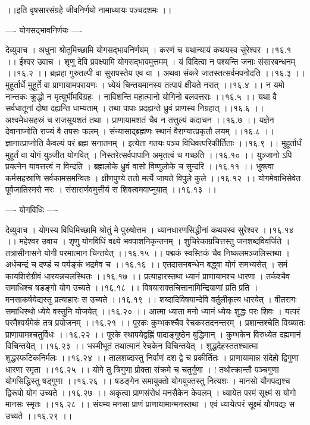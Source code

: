\documentclass[11pt]{book}
\begin{document}
\begin{landscape}
 ।।इति वृषसारसंग्रहे जीवनिर्णयो नामाध्यायः पञ्चदशमः ।।





---- योगसद्भावनिर्णयः ----

देव्युवाच ।
अधुना श्रोतुमिच्छामि योगसद्भावनिर्णयम् ।
करणं च यथान्यायं कथयस्व सुरेश्वर ।।१६.१ ।।
ईश्वर उवाच ।
शृणु देवि प्रवक्ष्यामि योगसद्भावमुत्तमम् ।
यं विदित्वा न पश्यन्ति जनाः संसारबन्धनम् ।।१६.२ ।।
ब्रह्महा गुरुतल्पी वा सुरापस्तेय एव वा ।
अथवा संकरे जातस्तत्सर्वमपनोदति ।।१६.३ ।।
मुहूर्तार्धे मुहूर्ते वा प्राणायामपरायणः ।
ध्येयं चिन्तयमानस्य तत्पापं क्षीयते नरात् ।।१६.४ ।।
न यमो नान्तकः क्रुद्धो न मृत्युर्भीमविग्रहः ।
नाविशन्ति महात्मानो योगिनो बलवत्तराः ।।१६.५ ।।
यथा वै सर्वधातूनां दोषा दह्यन्ति धाम्यताम् ।
तथा पापाः प्रदह्यन्ते ध्रुवं प्राणस्य निग्रहात् ।।१६.६ ।।
अश्वमेधसहस्रं च राजसूयशतं तथा ।
प्राणायामशतं चैव न तत्तुल्यं कदाचन ।।१६.७ ।।
यज्ञेन देवानाप्नोति राज्यं वै तपसः फलम् ।
संन्यासाद्ब्रह्मणः स्थानं वैराग्यात्प्रकृतौ लयम् ।।१६.८ ।।
ज्ञानात्प्राप्नोति कैवल्यं परं ब्रह्म सनातनम् ।
इत्येता गतयः पञ्च विधिवत्परिकीर्तिताः ।।१६.९ ।।
मुहूर्तार्धं मुहूर्तं वा योगं युञ्जीत योगवित् ।
निस्तरेत्सर्वपापानि अमृतत्वं च गच्छति ।।१६.१० ।।
युञ्जानो ऽपि प्रयत्नेन यावत्तत्त्वं न विन्दति ।
ब्रह्मलोके ध्रुवं वासो विष्णुलोके च सुन्दरि ।।१६.११ ।।
भुक्त्वा कर्मसहस्राणि सर्वकामसमन्वितः ।
क्षीणपुण्ये ततो मर्त्ये जायते विपुले कुले ।।१६.१२ ।।
योगमेवाभिसेवेत पूर्वजातिस्मरो नरः ।
संसारार्णवमुत्तीर्य स शिवत्वमवाप्नुयात् ।।१६.१३ ।।

---- योगविधिः ----

देव्युवाच ।
योगस्य विधिमिच्छामि श्रोतुं मे पुरुषोत्तम ।
ध्यानधारणसिद्धीनां कथयस्व सुरेश्वर ।।१६.१४ ।।
महेश्वर उवाच ।
शृणु योगविधिं वक्ष्ये भवपाशनिकृन्तनम् ।
शुचिरेकाग्रचित्तस्तु जनशब्दविवर्जिते ।
तत्रासीनासने योगी परमात्मान चिन्तयेत् ।।१६.१५ ।।
पद्मकं स्वस्तिकं चैव निष्कलमञ्जलिस्तथा ।
अर्धचन्द्रं च दण्डं च पर्यङ्कं भद्रमेव च ।।१६.१६ ।।
एतदासनबन्धेन बद्ध्वा योगं समभ्यसेत् ।
समं कायशिरोग्रीवं धारयन्नचलस्थितः ।।१६.१७ ।।
प्रत्याहारस्तथा ध्यानं प्राणायामश्च धारणा ।
तर्कश्चैव समाधिश्च षडङ्गो योग उच्यते ।।१६.१८ ।।
विषयासक्तचित्तानामिन्द्रियाणां प्रति प्रति ।
मनसाकर्षयेद्यस्तु प्रत्याहारः स उच्यते ।।१६.१९ ।।
शब्दादिविषयान्देवि वर्तुलीकृत्य धारयेत् ।
वीतरागः समाधिस्थो ध्येये वस्तुनि योजयेत् ।।१६.२० ।।
आत्मा ध्याता मनो ध्यानं ध्येयः शुद्धः परः शिवः ।
यत्परं परमैश्वर्यमेकं तत्र प्रयोजनम् ।।१६.२१ ।।
पूरकः कुम्भकश्चैव रेचकस्तदनन्तरम् ।
प्रशान्तश्चेति विख्यातः प्राणायामश्चतुर्विधः ।।१६.२२ ।।
पूरके स्थापयेद्वह्निं पादाङ्गुष्ठेन बुद्धिमान् ।
कुम्भकेन विरुध्येत दह्यमानं विचिन्तयेत् ।।१६.२३ ।।
भस्मीभूतं तथात्मानं रेचकेन विचिन्तयेत् ।
शुद्धदेहस्ततश्चात्मा शुद्धस्फटिकनिर्मलः ।।१६.२४ ।।
तालशब्दास्तु निर्वाणं दश द्वे च प्रकीर्तितः ।
प्राणायामान्न संदेहो द्विगुणा धारणा स्मृता ।।१६.२५ ।।
योगे तु त्रिगुणा प्रोक्ता संक्रमे च चतुर्गुणा ।
! तथोत्क्रान्तौ पञ्चगुणा योगसिद्धिस्तु षड्गुणा ।।१६.२६ ।।
षडङ्गेन समायुक्तो योगयुक्तस्तु नित्यशः ।
मानसो यौगपद्यश्च द्विरूपो योग उच्यते ।।१६.२७ ।।
अकृत्वा प्राणसंरोधं मनसैकेन केवलम् ।
ध्यायेत परमं सूक्ष्मं स योगो मानसः स्मृतः ।।१६.२८ ।।
संयम्य मनसा प्राणं प्राणायामान्मनस्तथा ।
एवं ध्यायेत्परं सूक्ष्मं यौगपद्यः स उच्यते ।।१६.२९ ।।


\end{landscape}
\end{document}
